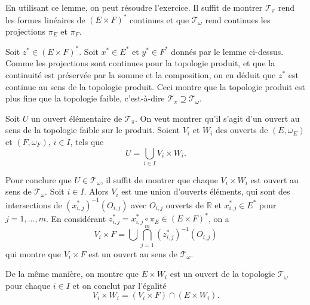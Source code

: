 En utilisant ce lemme, on peut résoudre l'exercice. Il suffit de montrer
$\mathcal{T}_\pi$ rend les formes linéaires de $(E\times F)^*$
continues et que $\mathcal{T}_\omega$ rend continues les projections
$\pi_E$ et $\pi_F$.

Soit $z^*\in(E\times F)^*$. Soit $x^*\in E^*$ et $y^*\in F^*$ donnés par
le lemme ci-dessus. Comme les projections sont continues pour la topologie
produit, et que la continuité est préservée par la somme et la composition,
on en déduit que $z^*$ est continue au sens de la topologie produit. Ceci
montre que la topologie produit est plus fine que la topologie faible,
c'est-à-dire $\mathcal{T}_\pi\supseteq \mathcal{T}_\omega$.

Soit $U$ un ouvert élémentaire de $\mathcal{T}_\pi$.
On veut montrer qu'il s'agit d'un ouvert au sens de la topologie faible
sur le produit. Soient $V_i$ et $W_i$ des ouverts de $(E, \omega_E)$ et
$(F, \omega_F)$, $i\in I$, tels que
$$U=\bigcup_{i\in I} V_i\times W_i.$$

Pour conclure que $U\in\mathcal{T}_\omega$, il suffit de montrer que chaque
$V_i\times W_i$ est ouvert au sens de $\mathcal{T}_\omega$. Soit $i\in I$.
Alors $V_i$ est une union d'ouverts éléments, qui sont
des intersections de $(x_{i, j}^*)^{-1}(O_{i, j})$
avec $O_{i, j}$ ouverts de $\mathbb R$ et $x_{i, j}^*\in E^*$ pour $j = 1, \ldots, m$.
En considérant $z_{i, j}^*=x^*_{i, j}\circ\pi_E\in (E\times F)^*$, on a
$$V_i\times F = \bigcup\bigcap_{j=1}^m (z_{i, j}^*)^{-1}(O_{i, j})$$
qui montre que $V_i\times F$ est un ouvert au sens de $\mathcal{T}_\omega$.

De la même manière, on montre que $E\times W_i$ est un ouvert de
la topologie $\mathcal{T}_\omega$ pour chaque $i\in I$ et on conclut
par l'égalité
$$V_i\times W_i = (V_i\times F)\cap(E\times W_i).$$
